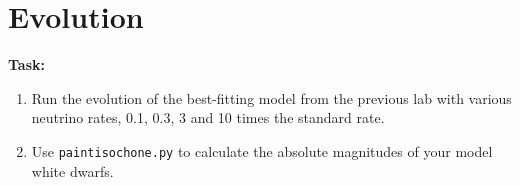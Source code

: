 \documentclass{article}
\begin{document}

\section{Evolution}

\textbf{Task:}
\begin{enumerate}
 \setlength\itemsep{0em}
    \item 
Run the evolution of the best-fitting model from the previous lab with various neutrino rates, 0.1, 0.3, 3 and 10 times the standard rate.
\item Use \texttt{paintisochone.py} to calculate the absolute magnitudes of your model white dwarfs.
\end{enumerate}


\end{document}
